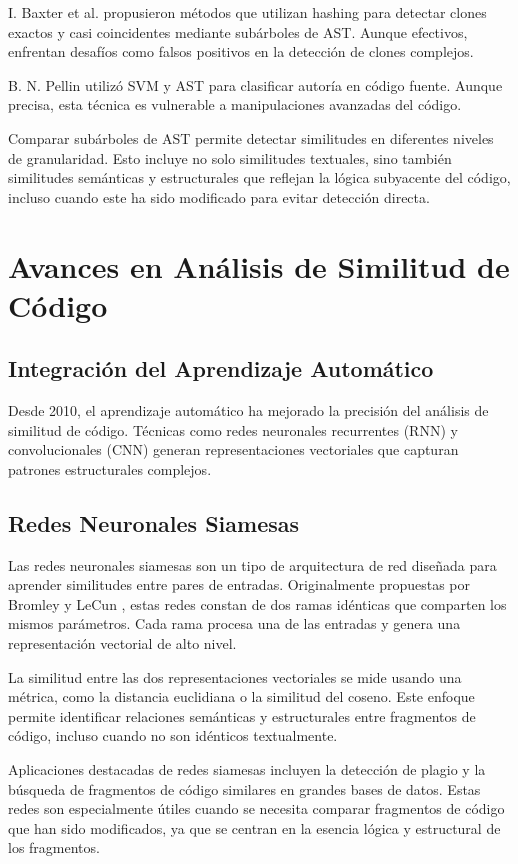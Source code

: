 I. Baxter et al. \cite{baxter1998clone} propusieron métodos que utilizan hashing para detectar clones exactos y casi coincidentes mediante subárboles de AST. Aunque efectivos, enfrentan desafíos como falsos positivos en la detección de clones complejos.

B. N. Pellin \cite{pellin2004authorship} utilizó SVM y AST para clasificar autoría en código fuente. Aunque precisa, esta técnica es vulnerable a manipulaciones avanzadas del código.

Comparar subárboles de AST permite detectar similitudes en diferentes niveles de granularidad. Esto incluye no solo similitudes textuales, sino también similitudes semánticas y estructurales que reflejan la lógica subyacente del código, incluso cuando este ha sido modificado para evitar detección directa.

\section{Avances en Análisis de Similitud de Código}

\subsection{Integración del Aprendizaje Automático}
Desde 2010, el aprendizaje automático ha mejorado la precisión del análisis de similitud de código. Técnicas como redes neuronales recurrentes (RNN) y convolucionales (CNN) generan representaciones vectoriales que capturan patrones estructurales complejos.

\subsection{Redes Neuronales Siamesas}
Las redes neuronales siamesas son un tipo de arquitectura de red diseñada para aprender similitudes entre pares de entradas. Originalmente propuestas por Bromley y LeCun \cite{bromley1993signature}, estas redes constan de dos ramas idénticas que comparten los mismos parámetros. Cada rama procesa una de las entradas y genera una representación vectorial de alto nivel.

La similitud entre las dos representaciones vectoriales se mide usando una métrica, como la distancia euclidiana o la similitud del coseno. Este enfoque permite identificar relaciones semánticas y estructurales entre fragmentos de código, incluso cuando no son idénticos textualmente.

Aplicaciones destacadas de redes siamesas incluyen la detección de plagio y la búsqueda de fragmentos de código similares en grandes bases de datos. Estas redes son especialmente útiles cuando se necesita comparar fragmentos de código que han sido modificados, ya que se centran en la esencia lógica y estructural de los fragmentos.

